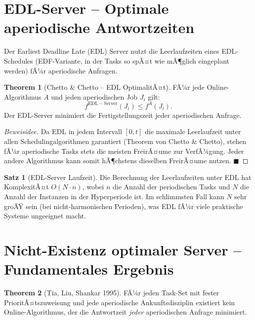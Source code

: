 ﻿\documentclass[a4paper,12pt]{report}
\theoremstyle{definition}
\newtheorem{satz}{Satz}[chapter]
\newtheorem{theorem}{Theorem}[chapter]
\begin{document}
\section{EDL-Server -- Optimale aperiodische Antwortzeiten}

Der Earliest Deadline Late (EDL) Server nutzt die Leerlaufzeiten eines EDL-Schedules
(EDF-Variante, in der Tasks so spÃ¤t wie mÃ¶glich eingeplant werden) fÃ¼r aperiodische
Anfragen.

\begin{theorem}[Chetto \& Chetto -- EDL OptimalitÃ¤t]
	FÃ¼r jede Online-Algorithmus $A$ und jeden aperiodischen Job $J_i$ gilt:
	\[
		f^{\mathrm{EDL-Server}}(J_i) \leq f^A(J_i).
	\]
	Der EDL-Server minimiert die Fertigstellungszeit jeder aperiodischen Anfrage.
\end{theorem}

\begin{proof}[Beweisidee]
	Da EDL in jedem Intervall $[0,t]$ die maximale Leerlaufzeit unter allen
	Schedulingalgorithmen garantiert (Theorem von Chetto \& Chetto), stehen
	fÃ¼r aperiodische Tasks stets die meisten FreirÃ¤ume zur VerfÃ¼gung. Jeder andere
	Algorithmus kann somit hÃ¶chstens dieselben FreirÃ¤ume nutzen. \hfill$\blacksquare$
\end{proof}

\begin{satz}[EDL-Server Laufzeit]
	Die Berechnung der Leerlaufzeiten unter EDL hat KomplexitÃ¤t $O(N \cdot n)$,
	wobei $n$ die Anzahl der periodischen Tasks und $N$ die Anzahl der
	Instanzen in der Hyperperiode ist. Im schlimmsten Fall kann $N$ sehr groÃŸ
	sein (bei nicht-harmonischen Perioden), was EDL fÃ¼r viele praktische Systeme
	ungeeignet macht.
\end{satz}

\section{Nicht-Existenz optimaler Server -- Fundamentales Ergebnis}

\begin{theorem}[Tia, Liu, Shankar 1995]
	FÃ¼r jeden Task-Set mit fester PrioritÃ¤tszuweisung und jede aperiodische
	Ankunftsdisziplin existiert kein Online-Algorithmus, der die Antwortzeit
	\emph{jeder} aperiodischen Anfrage minimiert.
\end{theorem}
\end{document}
